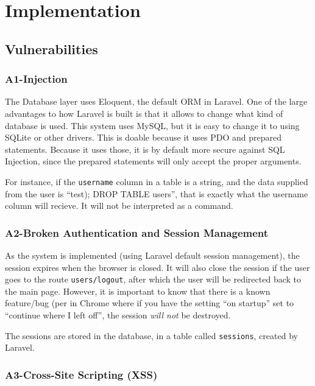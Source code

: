 \chapter{Implementation}
\label{ch:implementation}

\section{Vulnerabilities}
\subsection{A1-Injection}

The Database layer uses Eloquent, the default ORM in Laravel. One of the large advantages to how Laravel is built is that it allows to change what kind of database is used. This system uses MySQL, but it is easy to
change it to using SQLite or other drivers. This is doable because it uses PDO and prepared statements. Because it uses those, it is by default more secure against SQL Injection, since the prepared statements
will only accept the proper arguments.

For instance, if the \texttt{username} column in a table is a string, and the data supplied from the user is ``test); DROP TABLE users'', that is exactly what the username column will recieve. It will not be
interpreted as a command.

\subsection{A2-Broken Authentication and Session Management}

As the system is implemented (using Laravel default session management), the session expires when the browser is closed. It will also close the session if the user goes to the route \texttt{users/logout}, after which the user will be redirected back to the main page. However, it is important to know that there is a
known feature/bug (per \citep{Google2013cwili} in Chrome where if you have the  setting ``on startup'' set to ``continue where I left off'', the session \emph{will not} be destroyed.

The sessions are stored in the database, in a table called \texttt{sessions}, created by Laravel.

\subsection{A3-Cross-Site Scripting (XSS)}

